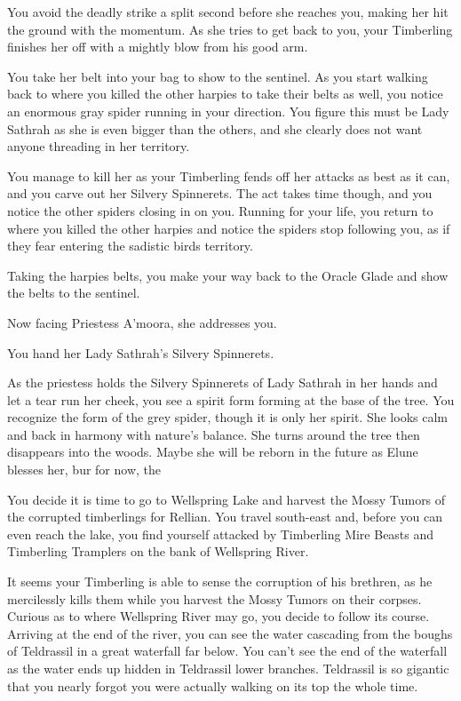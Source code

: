 
You avoid the deadly strike a split second before she reaches you, making her hit the ground with the momentum. As she tries to get back to you, your Timberling finishes her off with a mightly blow from his good arm.

You take her belt into your bag to show to the sentinel. As you start walking back to where you killed the other harpies to take their belts as well, you notice an enormous gray spider running in your direction. You figure this must be Lady Sathrah as she is even bigger than the others, and she clearly does not want anyone threading in her territory.

You manage to kill her as your Timberling fends off her attacks as best as it can, and you carve out her Silvery Spinnerets. The act takes time though, and you notice the other spiders closing in on you. Running for your life, you return to where you killed the other harpies and notice the spiders stop following you, as if they fear entering the sadistic birds territory.

Taking the harpies belts, you make your way back to the Oracle Glade and show the belts to the sentinel.


Now facing Priestess A'moora, she addresses you.


You hand her Lady Sathrah's Silvery Spinnerets.


As the priestess holds the Silvery Spinnerets of Lady Sathrah in her hands and let a tear run her cheek, you see a spirit form forming at the base of the tree. You recognize the form of the grey spider, though it is only her spirit. She looks calm and back in harmony with nature's balance. She turns around the tree then disappears into the woods. Maybe she will be reborn in the future as Elune blesses her, bur for now, the 

You decide it is time to go to Wellspring Lake and harvest the Mossy Tumors of the corrupted timberlings for Rellian. You travel south-east and, before you can even reach the lake, you find yourself attacked by Timberling Mire Beasts and Timberling Tramplers on the bank of Wellspring River.

It seems your Timberling is able to sense the corruption of his brethren, as he mercilessly kills them while you harvest the Mossy Tumors on their corpses. Curious as to where Wellspring River may go, you decide to follow its course. Arriving at the end of the river, you can see the water cascading from the boughs of Teldrassil in a great waterfall far below. You can't see the end of the waterfall as the water ends up hidden in Teldrassil lower branches. Teldrassil is so gigantic that you nearly forgot you were actually walking on its top the whole time.

